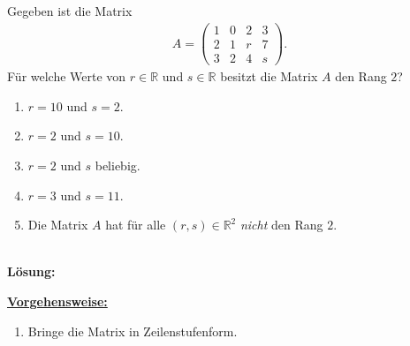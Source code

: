\subsection*{}
Gegeben ist die Matrix
\begin{align*}
	A =
	\begin{pmatrix}
		1 & 0 & 2 & 3 \\
		2 & 1 & r & 7 \\
		3 & 2 & 4 &  s 
	\end{pmatrix}.
\end{align*}
Für welche Werte von $ r \in \mathbb{R} $ und $ s \in \mathbb{R} $ besitzt die Matrix $ A $ den Rang $ 2 $?
\renewcommand{\labelenumi}{(\alph{enumi})}
\begin{enumerate}
	\item 
	$ r = 10 $ und $ s = 2 $.
	\item 
	$ r =  2 $ und $ s = 10 $.
	\item
	$ r = 2 $ und $ s $ beliebig.
	\item
	$ r = 3 $ und $ s = 11 $.
	\item
	Die Matrix $ A $ hat für alle $ (r,s) \in \mathbb{R}^2 $ \textit{nicht} den Rang $ 2 $.
\end{enumerate}
\ \\
\textbf{Lösung:}
\begin{mdframed}
\underline{\textbf{Vorgehensweise:}}
\renewcommand{\labelenumi}{\theenumi.}
\begin{enumerate}
\item Bringe die Matrix in Zeilenstufenform.
\end{enumerate}
\end{mdframed}


